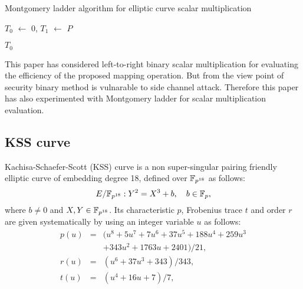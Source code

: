          \begin{algorithm}[H]
          \caption{Montgomery ladder algorithm for elliptic curve scalar multiplication}
          \label{alg:mont}
          \DontPrintSemicolon
          \hspace{-3ex}
          \;
          \hspace{-3ex}
           \;%
          \nl $T_0$ $ \leftarrow$ $0$, $T_1$ $\leftarrow$ $P$ \;
          \nl {} {\;
         
                    {
                }
          }\;
          \nl {} $T_0$\;
        \end{algorithm}
        This paper has considered left-to-right binary scalar multiplication for evaluating the efficiency of the proposed mapping operation. But from the view point of security binary method is vulnarable to side channel attack. Therefore this paper has also experimented with Montgomery ladder \cite{Silverman} for scalar multiplication evaluation.
        
        \subsection{KSS curve}
        Kachisa-Schaefer-Scott (KSS) curve \cite{kss} is a non super-singular pairing friendly elliptic curve of embedding degree 18, defined over $\mathbb{F}_{p^{18}}$ as follows: 
        \begin{equation}\label{eq:KSS_curve}
        E/\mathbb{F}_{p^{18}}:Y^2=X^3+b, \quad \mbox{$b \in {\mathbb{F}}_{p}$},
        \end{equation}
        where $b \neq 0$ and $X,Y \in \mathbb{F}_{p^{18}}$. Its characteristic $p$, Frobenius trace $t$ and order $r$ are given systematically by using an integer variable $u$ as follows:
        \begin{subequations}
        \begin{eqnarray}
        p(u) &= & (u^8 +5u^7 +7u^6 +37u^5 +188u^4 +259u^3 \nonumber \\
        & & + 343u^2 +1763u+2401)/21,\\\label{eq:kss_char}
        r(u) &= &(u^6 + 37u^3 + 343)/343,\label{eq:kss_degree}  \\
        t(u) &=& (u^4 + 16u + 7)/7, \label{eq:kss_trace} 
        \end{eqnarray}
        \end{subequations} 
        
